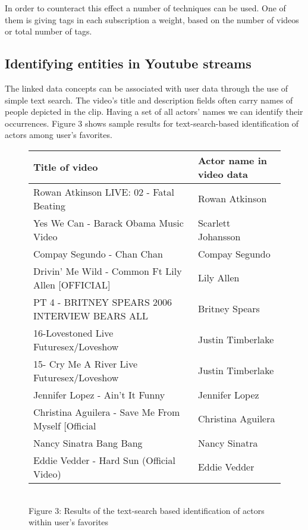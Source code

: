 In order to counteract this effect a number of techniques can be used. One of
them is giving tags in each subscription a weight, based on the number of videos or
total number of tags.

\subsection{Identifying entities in Youtube streams}
The linked data concepts can be associated with user data through the use of
simple text search. The video's title and description fields often carry names
of people depicted in the clip. Having a set of all actors' names we can
identify their occurrences. Figure 3 shows sample results for text-search-based
identification of actors among user's favorites.

\begin{figure}[h!]
  \begin{center}
    \begin{tabular}{ | p{7cm} | p{4cm} | } \hline
      Title of video & Actor name in video data \\ \hline
      Rowan Atkinson LIVE: 02 - Fatal Beating & Rowan Atkinson \\ \hline
      Yes We Can - Barack Obama Music Video & Scarlett Johansson \\ \hline
      Compay Segundo - Chan Chan & Compay Segundo \\ \hline
      Drivin' Me Wild - Common Ft Lily Allen [OFFICIAL] & Lily Allen \\ \hline
      PT 4 - BRITNEY SPEARS 2006 INTERVIEW BEARS ALL & Britney Spears \\ \hline
      16-Lovestoned Live Futuresex/Loveshow & Justin Timberlake \\ \hline
      15- Cry Me A River Live Futuresex/Loveshow & Justin Timberlake \\ \hline
      Jennifer Lopez - Ain't It Funny & Jennifer Lopez \\ \hline
      Christina Aguilera - Save Me From Myself [Official & Christina Aguilera \\ \hline
      Nancy Sinatra Bang Bang & Nancy Sinatra \\ \hline
      Eddie Vedder - Hard Sun (Official Video) & Eddie Vedder \\ \hline
    \end{tabular} \\
    Figure 3: Results of the text-search based identification of actors within user's favorites \\
  \end{center}
\end{figure}

